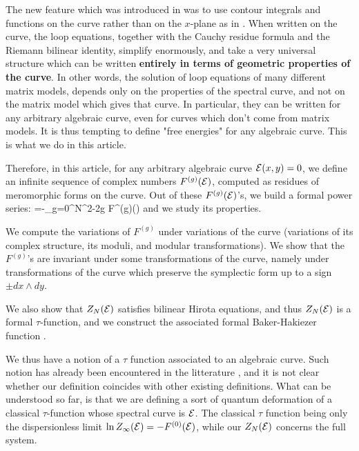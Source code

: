 The new feature which was introduced in \cite{eynloop1mat} was to use contour integrals and functions on the curve rather than on the $x$-plane as in \cite{ACKM}.
When written on the curve, the loop equations, together with the Cauchy residue formula and the Riemann bilinear identity, simplify enormously, and take a very universal structure which can be written {\bf entirely in terms of geometric properties of the curve}.
In other words, the solution of loop equations of many different matrix models, depends only on the properties of the spectral curve, and not on the matrix model which gives that curve.
In particular, they can be written for any arbitrary algebraic curve, even for curves which don't come from matrix models.
It is thus tempting to define "free energies" for any algebraic curve.
This is what we do in this article.

\bigskip

Therefore, in this article, for any arbitrary algebraic curve ${\cal E}(x,y)=0$, we define an infinite sequence of complex numbers $F^{(g)}({\cal E})$, computed as residues of meromorphic forms on the curve.
Out of these $F^{(g)}({\cal E})$'s, we build a formal power series:
\beq
{}=-\sum_{g=0}^\infty N^{2-2g} F^{(g)}(\curve)
\eeq
and we study its properties.

\medskip

We compute the variations of $F^{(g)}$ under variations of the curve (variations of its complex structure, its moduli, and modular transformations).
We show that the $F^{(g)}$'s are invariant under some transformations of the curve,
namely under transformations of the curve which preserve the symplectic form up to a sign $\pm dx\wedge dy$.

\smallskip

We also show that $Z_N({\cal E})$ satisfies bilinear Hirota equations, and thus $Z_N({\cal E})$ is a formal $\tau$-function, and we construct the associated formal Baker-Hakiezer function \cite{BBT}.

We thus have a notion of a $\tau$ function associated to an algebraic curve.
Such notion has already been encountered in the litterature \cite{BBT}, and it is not clear whether our definition coincides with other existing definitions.
What can be understood so far, is that we are defining a sort of quantum deformation of a classical $\tau$-function whose spectral curve is ${\cal E}$.
The classical $\tau$ function being only the dispersionless limit $ \ln{Z_{\infty}({\cal E})} = - F^{(0)}({\cal E})$, while our $Z_N({\cal E})$ concerns the full system.

